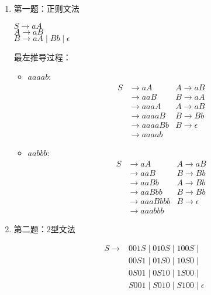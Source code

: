 \documentclass{article}
\begin{document}
	\begin{enumerate}[noitemsep, label={{\arabic*}.}]
		\item  第一题：正则文法
		
		\begin{tcolorbox}[colback = blue!25!white, colframe = blue!75!black]
			$ S \rightarrow aA $ \\
			$ A \rightarrow aB $ \\
			$ B \rightarrow aA \mid Bb \mid \epsilon $
		\end{tcolorbox}
		
		最左推导过程：
		
		\begin{itemize}
			\item $aaaab$:  
			\setlength{\jot}{0pt}
			\begin{align*}
				S &\rightarrow aA      &A \to aB\\
				  &\rightarrow aaB     &B \to aA\\
				  &\rightarrow aaaA    &A \to aB\\
				  &\rightarrow aaaaB   &B \to Bb\\
				  &\rightarrow aaaaBb  &B \to \epsilon\\
				  &\rightarrow aaaa b  &
			\end{align*}
			
			\item $aabbb$: 
			\setlength{\jot}{0pt}
			\begin{align*}
				S &\rightarrow aA      &A \to aB\\
				  &\rightarrow aaB     &B \to Bb\\
				  &\rightarrow aaBb    &A \to Bb\\
				  &\rightarrow aaBbb   &B \to Bb\\
				  &\rightarrow aaaBbbb &B \to \epsilon\\
				  &\rightarrow aaa bbb &
			\end{align*}
		\end{itemize}
		
		\item 第二题：2型文法
		
		\begin{tcolorbox}[colback = blue!25!white, colframe = blue!75!black]
			\begin{align*}
				S \rightarrow & 001S \mid 010S \mid 100S \mid \\
				              & 00S1 \mid 01S0 \mid 10S0 \mid \\
				              & 0S01 \mid 0S10 \mid 1S00 \mid \\
				              & S001 \mid S010 \mid S100 \mid \epsilon
			\end{align*}
		\end{tcolorbox}
		

\end{enumerate}
\end{document}
